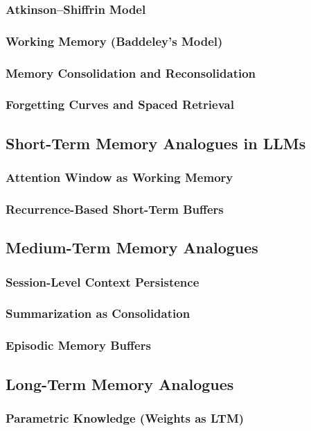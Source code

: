 \documentclass[12pt, letterpaper]{article}
\begin{document}
\subsubsection{Atkinson--Shiffrin Model}
\subsubsection{Working Memory (Baddeley's Model)}
\subsubsection{Memory Consolidation and Reconsolidation}
\subsubsection{Forgetting Curves and Spaced Retrieval}
\subsection{Short-Term Memory Analogues in LLMs}
\subsubsection{Attention Window as Working Memory}
\subsubsection{Recurrence-Based Short-Term Buffers}
\subsection{Medium-Term Memory Analogues}
\subsubsection{Session-Level Context Persistence}
\subsubsection{Summarization as Consolidation}
\subsubsection{Episodic Memory Buffers}
\subsection{Long-Term Memory Analogues}
\subsubsection{Parametric Knowledge (Weights as LTM)}
\end{document}
